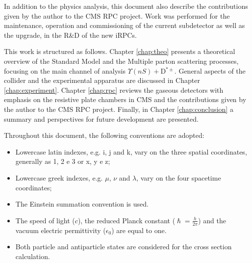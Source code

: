 In addition to the physics analysis, this document also describe the contributions given by the author to the CMS RPC project. Work was performed for the maintenance, operation and commissioning of the current subdetector as well as the upgrade, in the R\&D of the new iRPCs. 

This work is structured as follows. Chapter \ref{chap:theo} presents a theoretical overview of the Standard Model and the Multiple parton scattering processes, focusing on the main channel of analysis $\Upsilon(nS) + $D$^{*\pm}$. General aspects of the collider and the experimental apparatus are discussed in Chapter \ref{chap:experiment}. Chapter \ref{chap:rpc} reviews the gaseous detectors with emphasis on the resistive plate chambers in CMS and the contributions given by the author to the CMS RPC project. Finally, in Chapter \ref{chap:conclusion} a summary and perspectives for future development are presented.

Throughout this document, the following conventions are adopted:
\begin{itemize}
    \item Lowercase latin indexes, e.g. i, j and k, vary on the three spatial coordinates, generally as 1, 2 e 3 or x, y e z;
    \item Lowercase greek indexes, e.g. $\mu$, $\nu$ and $\lambda$, vary on the four spacetime coordinates;
    \item The Einstein summation convention is used.
    \item The speed of light ($c$), the reduced Planck constant ($\hslash = \frac{h}{2\pi}$) and the vacuum electric permittivity ($\epsilon_0$) are equal to one.
    \item Both particle and antiparticle states are considered for the cross section calculation.
\end{itemize}